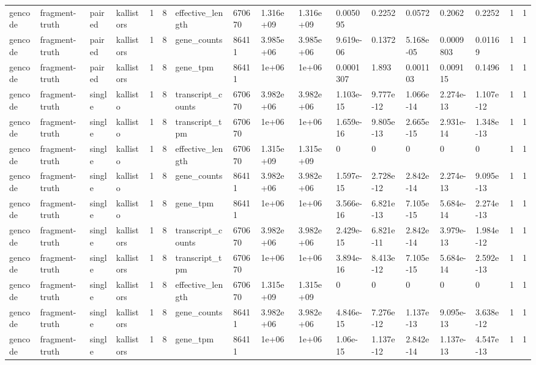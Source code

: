 \begin{tabular}{lllllllllllllllll}
gencode & fragment-truth & paired & kallistors & 1 & 8 & effective\_length & 670670 & 1.316e+09 & 1.316e+09 & 0.005095 & 0.2252 & 0.0572 & 0.2062 & 0.2252 & 1 & 1 \\
gencode & fragment-truth & paired & kallistors & 1 & 8 & gene\_counts & 86411 & 3.985e+06 & 3.985e+06 & 9.619e-06 & 0.1372 & 5.168e-05 & 0.0009803 & 0.01169 & 1 & 1 \\
gencode & fragment-truth & paired & kallistors & 1 & 8 & gene\_tpm & 86411 & 1e+06 & 1e+06 & 0.0001307 & 1.893 & 0.001103 & 0.009115 & 0.1496 & 1 & 1 \\
gencode & fragment-truth & single & kallisto & 1 & 8 & transcript\_counts & 670670 & 3.982e+06 & 3.982e+06 & 1.103e-15 & 9.777e-12 & 1.066e-14 & 2.274e-13 & 1.107e-12 & 1 & 1 \\
gencode & fragment-truth & single & kallisto & 1 & 8 & transcript\_tpm & 670670 & 1e+06 & 1e+06 & 1.659e-16 & 9.805e-13 & 2.665e-15 & 2.931e-14 & 1.348e-13 & 1 & 1 \\
gencode & fragment-truth & single & kallisto & 1 & 8 & effective\_length & 670670 & 1.315e+09 & 1.315e+09 & 0 & 0 & 0 & 0 & 0 & 1 & 1 \\
gencode & fragment-truth & single & kallisto & 1 & 8 & gene\_counts & 86411 & 3.982e+06 & 3.982e+06 & 1.597e-15 & 2.728e-12 & 2.842e-14 & 2.274e-13 & 9.095e-13 & 1 & 1 \\
gencode & fragment-truth & single & kallisto & 1 & 8 & gene\_tpm & 86411 & 1e+06 & 1e+06 & 3.566e-16 & 6.821e-13 & 7.105e-15 & 5.684e-14 & 2.274e-13 & 1 & 1 \\
gencode & fragment-truth & single & kallistors & 1 & 8 & transcript\_counts & 670670 & 3.982e+06 & 3.982e+06 & 2.429e-15 & 6.821e-11 & 2.842e-14 & 3.979e-13 & 1.984e-12 & 1 & 1 \\
gencode & fragment-truth & single & kallistors & 1 & 8 & transcript\_tpm & 670670 & 1e+06 & 1e+06 & 3.894e-16 & 8.413e-12 & 7.105e-15 & 5.684e-14 & 2.592e-13 & 1 & 1 \\
gencode & fragment-truth & single & kallistors & 1 & 8 & effective\_length & 670670 & 1.315e+09 & 1.315e+09 & 0 & 0 & 0 & 0 & 0 & 1 & 1 \\
gencode & fragment-truth & single & kallistors & 1 & 8 & gene\_counts & 86411 & 3.982e+06 & 3.982e+06 & 4.846e-15 & 7.276e-12 & 1.137e-13 & 9.095e-13 & 3.638e-12 & 1 & 1 \\
gencode & fragment-truth & single & kallistors & 1 & 8 & gene\_tpm & 86411 & 1e+06 & 1e+06 & 1.06e-15 & 1.137e-12 & 2.842e-14 & 1.137e-13 & 4.547e-13 & 1 & 1 \\

\end{tabular}

